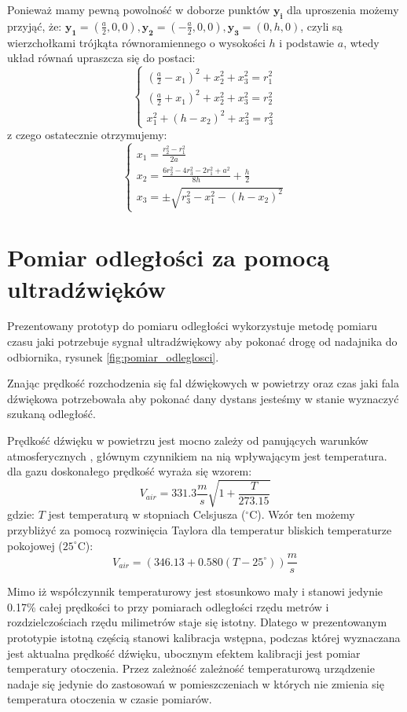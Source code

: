 Ponieważ mamy pewną powolność w doborze punktów $\boldsymbol{y_i}$ dla uproszenia możemy przyjąć, że:
$\boldsymbol{y_1}=(\frac{a}{2},0,0), \boldsymbol{y_2}=(-\frac{a}{2},0,0), \boldsymbol{y_3}=(0,h,0)$, czyli są wierzchołkami
trójkąta równoramiennego o wysokości $h$ i podstawie $a$, wtedy układ równań upraszcza
się do postaci:
\[
 \begin{cases}
     (\frac{a}{2}-x_1)^2 + x_2^2 + x_3^2 = r_1^2
 \\  (\frac{a}{2}+x_1)^2 + x_2^2 + x_3^2 = r_2^2
 \\  x_1^2 + (h-x_2)^2 + x_3^2 = r_3^2
 \end{cases}
\]
z czego ostatecznie otrzymujemy:
\[
 \begin{cases}
     x_1 = \frac{r_2^2 - r_1^2}{2a}
 \\  x_2 = \frac{6r_2^2 - 4r_3^2 - 2r_1^2 + a^2}{8h}  + \frac{h}{2}
 \\  x_3 = \pm \sqrt{r_3^2-x_1^2-(h-x_2)^2}
 \end{cases}
\]






\section{Pomiar odległości za pomocą ultradźwięków}

Prezentowany prototyp do pomiaru odległości wykorzystuje metodę pomiaru czasu jaki 
potrzebuje sygnał ultradźwiękowy aby pokonać drogę od nadajnika do odbiornika,
rysunek \ref{fig:pomiar_odleglosci}.

Znając prędkość rozchodzenia się fal dźwiękowych w powietrzy oraz czas jaki fala dźwiękowa potrzebowała
aby pokonać dany dystans jesteśmy w stanie wyznaczyć szukaną odległość.

Prędkość dźwięku w powietrzu jest mocno zależy od panujących warunków atmosferycznych \cite{bib:soundSpeed},  
głównym czynnikiem na nią wpływającym jest temperatura.
dla gazu doskonałego prędkość wyraża się wzorem:
\[
V_{air} = 331.3  \frac{m}{s}  \sqrt{1+\frac{T}{273.15}}
\]
gdzie: $T$ jest temperaturą w stopniach Celsjusza ($^\circ$C).
Wzór ten możemy przybliżyć za pomocą rozwinięcia Taylora dla temperatur bliskich temperaturze pokojowej ($25^\circ$C):
\[
 V_{air} = (346.13  +  0.580(T - 25^\circ)) \frac{m}{s}
\]

Mimo iż współczynnik temperaturowy jest stosunkowo mały i stanowi jedynie 0.17\% całej prędkości
to przy pomiarach odległości rzędu metrów i rozdzielczościach rzędu milimetrów staje się istotny. 
Dlatego w prezentowanym prototypie istotną częścią stanowi kalibracja wstępna, podczas której
wyznaczana jest aktualna prędkość dźwięku, ubocznym efektem kalibracji jest pomiar temperatury otoczenia.
Przez zależność zależność temperaturową urządzenie nadaje się jedynie do zastosowań w pomieszczeniach
w których nie zmienia się temperatura otoczenia w czasie pomiarów.




